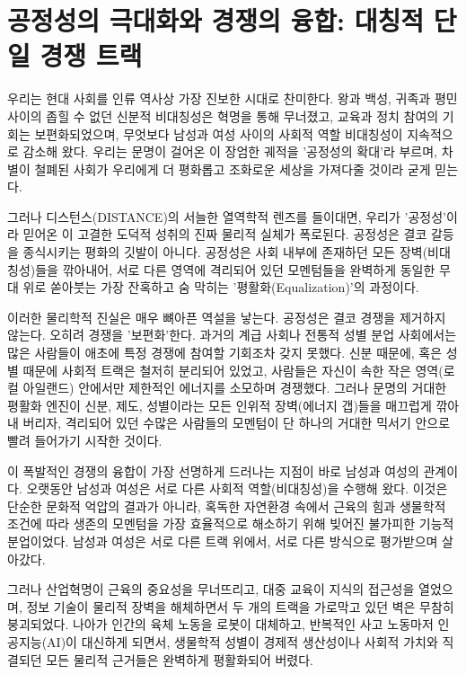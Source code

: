 

\section{공정성의 극대화와 경쟁의 융합: 대칭적 단일 경쟁 트랙}
우리는 현대 사회를 인류 역사상 가장 진보한 시대로 찬미한다. 왕과 백성, 귀족과 평민 사이의 좁힐 수 없던 신분적 비대칭성은 혁명을 통해 무너졌고, 교육과 정치 참여의 기회는 보편화되었으며, 무엇보다 남성과 여성 사이의 사회적 역할 비대칭성이 지속적으로 감소해 왔다. 우리는 문명이 걸어온 이 장엄한 궤적을 '공정성의 확대'라 부르며, 차별이 철폐된 사회가 우리에게 더 평화롭고 조화로운 세상을 가져다줄 것이라 굳게 믿는다.

그러나 디스턴스(DISTANCE)의 서늘한 열역학적 렌즈를 들이대면, 우리가 '공정성'이라 믿어온 이 고결한 도덕적 성취의 진짜 물리적 실체가 폭로된다. 공정성은 결코 갈등을 종식시키는 평화의 깃발이 아니다. 공정성은 사회 내부에 존재하던 모든 장벽(비대칭성)들을 깎아내어, 서로 다른 영역에 격리되어 있던 모멘텀들을 완벽하게 동일한 무대 위로 쏟아붓는 가장 잔혹하고 숨 막히는 '평활화(Equalization)'의 과정이다.

이러한 물리학적 진실은 매우 뼈아픈 역설을 낳는다. 공정성은 결코 경쟁을 제거하지 않는다. 오히려 경쟁을 '보편화'한다. 과거의 계급 사회나 전통적 성별 분업 사회에서는 많은 사람들이 애초에 특정 경쟁에 참여할 기회조차 갖지 못했다. 신분 때문에, 혹은 성별 때문에 사회적 트랙은 철저히 분리되어 있었고, 사람들은 자신이 속한 작은 영역(로컬 아일랜드) 안에서만 제한적인 에너지를 소모하며 경쟁했다. 그러나 문명의 거대한 평활화 엔진이 신분, 제도, 성별이라는 모든 인위적 장벽(에너지 갭)들을 매끄럽게 깎아내 버리자, 격리되어 있던 수많은 사람들의 모멘텀이 단 하나의 거대한 믹서기 안으로 빨려 들어가기 시작한 것이다.

이 폭발적인 경쟁의 융합이 가장 선명하게 드러나는 지점이 바로 남성과 여성의 관계이다. 오랫동안 남성과 여성은 서로 다른 사회적 역할(비대칭성)을 수행해 왔다. 이것은 단순한 문화적 억압의 결과가 아니라, 혹독한 자연환경 속에서 근육의 힘과 생물학적 조건에 따라 생존의 모멘텀을 가장 효율적으로 해소하기 위해 빚어진 불가피한 기능적 분업이었다. 남성과 여성은 서로 다른 트랙 위에서, 서로 다른 방식으로 평가받으며 살아갔다.

그러나 산업혁명이 근육의 중요성을 무너뜨리고, 대중 교육이 지식의 접근성을 열었으며, 정보 기술이 물리적 장벽을 해체하면서 두 개의 트랙을 가로막고 있던 벽은 무참히 붕괴되었다. 나아가 인간의 육체 노동을 로봇이 대체하고, 반복적인 사고 노동마저 인공지능(AI)이 대신하게 되면서, 생물학적 성별이 경제적 생산성이나 사회적 가치와 직결되던 모든 물리적 근거들은 완벽하게 평활화되어 버렸다.


